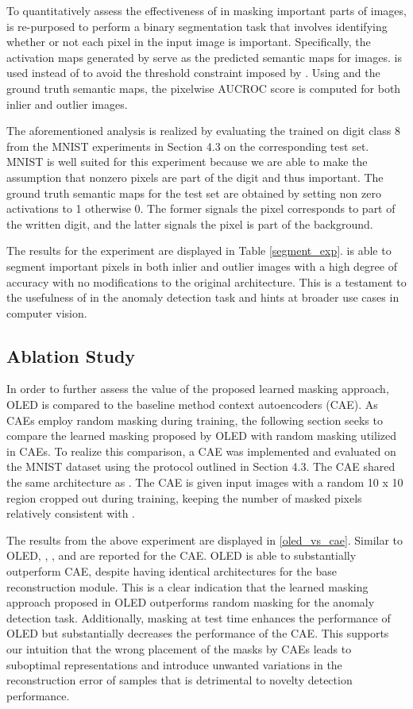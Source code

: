 \documentclass[10pt,twocolumn,letterpaper]{article}
\begin{document}
To quantitatively assess the effectiveness of  in masking important parts of images,  is re-purposed to perform a binary segmentation task that involves identifying whether or not each pixel in the input image is important. Specifically, the activation maps  generated by  serve as the predicted semantic maps for images.  is used instead of  to avoid the threshold constraint imposed by . Using  and the ground truth semantic maps, the pixelwise AUCROC score is computed for both inlier and outlier images. 

The aforementioned analysis is realized by evaluating the  trained on digit class 8 from the MNIST experiments in Section 4.3 on the corresponding test set. MNIST is well suited for this experiment because we are able to make the assumption that nonzero pixels are part of the digit and thus important. The ground truth semantic maps for the test set are obtained by setting non zero activations to 1 otherwise 0. 
The former signals the pixel corresponds to part of the written digit, and the latter signals the pixel is part of the background. 

The results for the experiment are displayed in Table \ref{segment_exp}.  is able to segment important pixels in both inlier and outlier images with a high degree of accuracy with no modifications to the original architecture. This is a testament to the usefulness of  in the anomaly detection task and hints at broader use cases in computer vision. 

\subsection{Ablation Study}
In order to further assess the value of the proposed learned masking approach, OLED is compared to the baseline method context autoencoders (CAE). As CAEs employ random masking during training, the following section seeks to compare the learned masking proposed by OLED with random masking utilized in CAEs. To realize this comparison, a CAE was implemented and evaluated on the MNIST dataset using the protocol outlined in Section 4.3. The CAE shared the same architecture as . The CAE is given input images with a random 10 x 10 region cropped out during training, keeping the number of masked pixels relatively consistent with . 

The results from the above experiment are displayed in \ref{oled_vs_cae}. Similar to OLED, , ,  and  are reported for the CAE. OLED is able to substantially outperform CAE, despite having identical architectures for the base reconstruction module. This is a clear indication that the learned masking approach proposed in OLED outperforms random masking for the anomaly detection task. Additionally, masking at test time enhances the performance of OLED but substantially decreases the performance of the CAE. This supports our intuition that the wrong placement of the masks by CAEs leads to suboptimal representations and introduce unwanted variations in the reconstruction error of samples that is detrimental to novelty detection performance.
\end{document}
